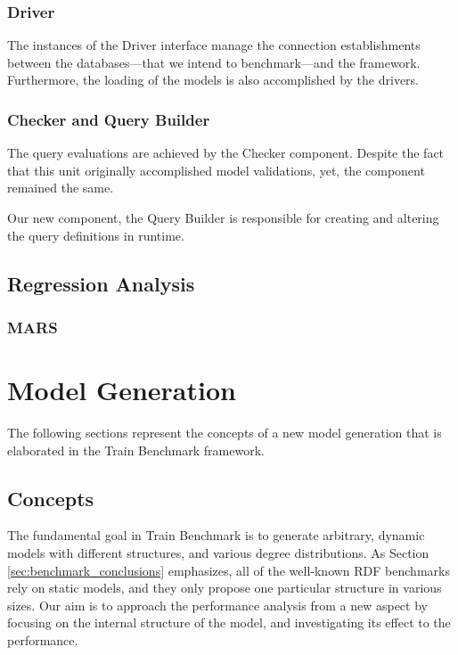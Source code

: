 \subsubsection{Driver}
The instances of the \textsf{Driver} interface manage the connection establishments between the databases---that we intend to benchmark---and the framework. Furthermore, the loading of the models is also accomplished by the drivers.

\subsubsection{Checker and Query Builder}

The query evaluations are achieved by the \textsf{Checker} component. Despite the fact that this unit originally accomplished model validations, yet, the component remained the same.

Our new component, the \textsf{Query Builder} is responsible for creating and altering the query definitions in runtime.

\subsection{Regression Analysis}

\subsubsection{MARS}


\section{Model Generation}

The following sections represent the concepts of a new model generation that is elaborated in the Train Benchmark framework.
\subsection{Concepts}
The fundamental goal in Train Benchmark is to generate arbitrary, dynamic models with different structures, and various degree distributions. As Section \ref{sec:benchmark_conclusions} emphasizes, all of the well-known RDF benchmarks rely on static models, and they only propose one particular structure in various sizes. Our aim is to approach the performance analysis from a new aspect by focusing on the internal structure of the model, and investigating its effect to the performance.

